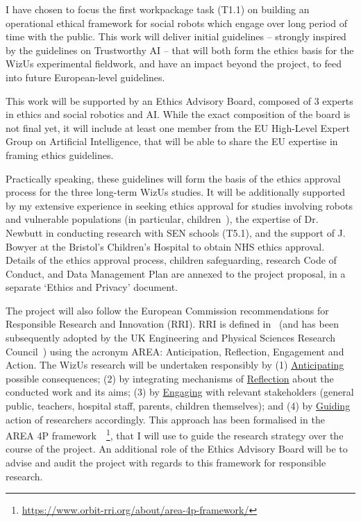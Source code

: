 \documentclass[11pt,a4paper]{report}
\newcommand{\project}{WizUs\xspace}
\begin{document}
I have chosen to focus the first workpackage task (T1.1) on building an
operational ethical framework for social robots which engage over long period of
time with the public. This work will deliver initial guidelines -- strongly
inspired by the guidelines on Trustworthy AI -- that will both form the ethics
basis for the \project experimental fieldwork, and have an impact beyond the
project, to feed into future European-level guidelines.

This work will be supported by an Ethics Advisory Board, composed of 3 experts
in ethics and social robotics and AI. While the exact composition of the board
is not final yet, it will include at least one member from the EU High-Level
Expert Group on Artificial Intelligence, that will be able to share the EU
expertise in framing ethics guidelines.

Practically speaking, these guidelines will form the basis of the ethics
approval process for the three long-term \project studies. It will be
additionally supported by my extensive experience in seeking ethics approval for
studies involving robots and vulnerable populations (in particular,
children~\cite{lemaignan2016learning,lemaignan2018pinsoro,senft2019teaching}),
the expertise of Dr. Newbutt in conducting research with SEN schools (T5.1), and
the support of J. Bowyer at the Bristol's Children's Hospital to obtain NHS ethics
approval. Details of the ethics approval process, children safeguarding,
research Code of Conduct, and Data Management Plan are annexed to the project
proposal, in a separate `Ethics and Privacy' document.


The project will also follow the European Commission recommendations for
Responsible Research and Innovation (RRI). RRI is defined
in~\cite{stilgoe2013developing} (and has been subsequently adopted by the UK Engineering
and Physical Sciences Research Council~\cite{owen2014uk}) using the acronym
AREA: Anticipation, Reflection, Engagement and Action. The \project research
will be undertaken responsibly by (1) \ul{Anticipating} possible consequences;
(2) by integrating mechanisms of \ul{Reflection} about the conducted work and its
aims; (3) by \ul{Engaging} with relevant stakeholders (general public, teachers,
hospital staff, parents, children themselves); and (4) by \ul{Guiding} action of
researchers accordingly. This approach has been formalised in the AREA 4P
framework~\cite{stahl2018implementing}~\footnote{\url{https://www.orbit-rri.org/about/area-4p-framework/}},
that I will use to guide the research strategy over the course of the project.
An additional role of the Ethics Advisory Board will be to advise and audit the
project with regards to this framework for responsible research.
\end{document}
